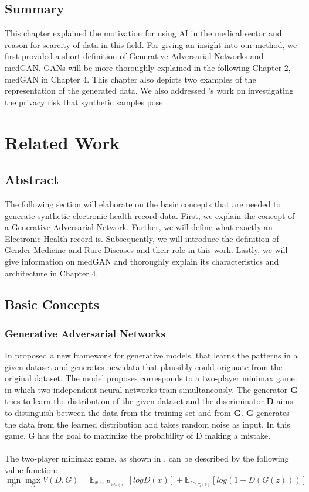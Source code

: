 \documentclass[11pt, a4paper]{book}
\begin{document}
\section{Summary}
This chapter explained the motivation for using AI in the medical sector and reason for scarcity of data in this field. For giving an insight into our method, we first provided a short definition of Generative Adversarial Networks and medGAN. GANs will be more thoroughly explained in the following Chapter 2, medGAN in Chapter 4. This chapter also depicts two examples of the representation of the generated data. We also addressed \cite{Choi2017}'s work on investigating the privacy risk that synthetic samples pose.

\chapter{Related Work}
\section{Abstract}
The following section will elaborate on the basic concepts that are needed to  generate synthetic electronic health record data.
First, we explain the concept of a Generative Adversarial Network. Further, we will define what exactly an Electronic Health record is. Subsequently, we will introduce the definition of Gender Medicine and Rare Diseases and their role in this work. Lastly, we will give information on medGAN and thoroughly explain its characteristics and architecture in Chapter 4.

\section{Basic Concepts}
\subsection{Generative Adversarial Networks}
In \cite{goodfellow2014generative} proposed a new framework for generative models, that learns the patterns in a given dataset and generates new data that plausibly could originate from the original dataset.
 The model \cite{Goodfellow2014} proposes corresponds to a two-player minimax game: in which two independent neural networks train simultaneously. The generator \textbf{G} tries to learn the distribution of the given dataset and the discriminator \textbf{D} aims to distinguish between the data from the training set and from \textbf{G}. \textbf{G} generates the data from the learned distribution and takes random noise as input. In this game, G has the goal to maximize the probability of D making a mistake.  
\\
\\
The two-player minimax game, as shown in \cite{Goodfellow2014}, can be described by the following value function:
\\
\begin{equation}
	\min_G\max_DV(D,G) = \mathbb{E}_{x\sim{P_{data(x)}}}[log D(x)] + \mathbb{E}_{z\sim_{P_z(z)}}[log(1 - D(G(z)))]
\end{equation}
\\
\end{document}
